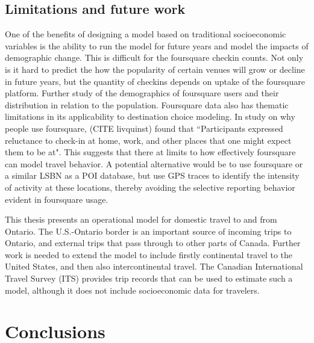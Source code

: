 
\section{Limitations and future work}
One of the benefits of designing a model based on traditional socioeconomic variables is the ability to run the model for future years and model the impacts of demographic change. This is difficult for the foursquare checkin counts. Not only is it hard to predict the how the popularity of certain venues will grow or decline in future years, but the quantity of checkins depends on uptake of the foursquare platform. Further study of the demographics of foursquare users and their distribution in relation to the population. Foursquare data also has thematic limitations in its applicability to destination choice modeling. 
In study on why people use foursquare, (CITE livquinst) found that ``Participants expressed reluctance to check-in at home, work, and other places that one might expect them to be at". This suggests that there at limits to how effectively foursquare can model travel behavior. A potential alternative would be to use foursquare or a similar LSBN as a POI database, but use GPS traces to identify the intensity of activity at these locations, thereby avoiding the selective reporting behavior evident in foursquare usage.

This thesis presents an operational model for domestic travel to and from Ontario. The U.S.-Ontario border is an important source of incoming trips to Ontario, and external trips that pass through to other parts of Canada. Further work is needed to extend the model to include firstly continental travel to the United States, and then also intercontinental travel. The Canadian International Travel Survey (ITS) provides trip records that can be used to estimate such a model, although it does not include socioeconomic data for travelers. 

\chapter{Conclusions}

